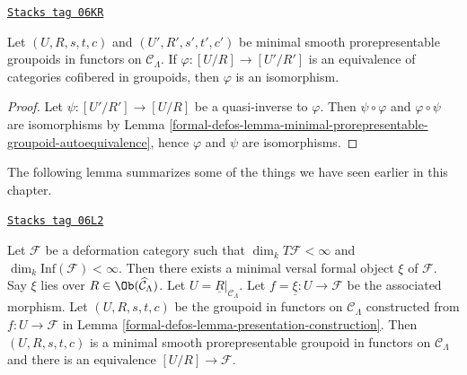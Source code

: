 \begin{lemma}
\label{formal-defos-lemma-minimal-prorepresentable-groupoid-equivalence}
\href{https://stacks.math.columbia.edu/tag/06KR}{\texttt{Stacks tag 06KR}}

Let $(U, R, s, t, c)$ and $(U', R', s', t', c')$ be minimal smooth
prorepresentable groupoids in functors on $\mathcal{C}_\Lambda$. If
$\varphi : [U/R] \to [U'/R']$ is an equivalence of categories cofibered
in groupoids, then $\varphi$ is an isomorphism.
\end{lemma}

\begin{proof}
Let $\psi : [U'/R'] \to [U/R]$ be a quasi-inverse to $\varphi$.
Then $\psi \circ \varphi$ and $\varphi \circ \psi$ are isomorphisms by
Lemma \ref{formal-defos-lemma-minimal-prorepresentable-groupoid-autoequivalence},
hence $\varphi$ and $\psi$ are isomorphisms.
\end{proof}

The following lemma summarizes some of the things we have seen earlier
in this chapter.

\begin{lemma}
\label{formal-defos-lemma-minimal-groupoid-in-functors-construction}
\href{https://stacks.math.columbia.edu/tag/06L2}{\texttt{Stacks tag 06L2}}

Let $\mathcal{F}$ be a deformation category such that
$\dim_k T\mathcal{F} <\infty$ and
$\dim_k \text{Inf}(\mathcal{F}) < \infty$.
Then there exists a minimal versal formal object $\xi$ of $\mathcal{F}$.
Say $\xi$ lies over $R \in \Ob(\widehat{\mathcal{C}}_\Lambda)$.
Let $U = \underline{R}|_{\mathcal{C}_\Lambda}$.
Let $f = \underline{\xi} : U \to \mathcal{F}$ be the associated
morphism. Let $(U, R, s, t, c)$ be the groupoid in functors on
$\mathcal{C}_\Lambda$ constructed from $f : U \to \mathcal{F}$ in
Lemma \ref{formal-defos-lemma-presentation-construction}.
Then $(U, R, s, t, c)$ is a minimal smooth prorepresentable
groupoid in functors on $\mathcal{C}_\Lambda$ and there
is an equivalence $[U/R] \to \mathcal{F}$.
\end{lemma}

